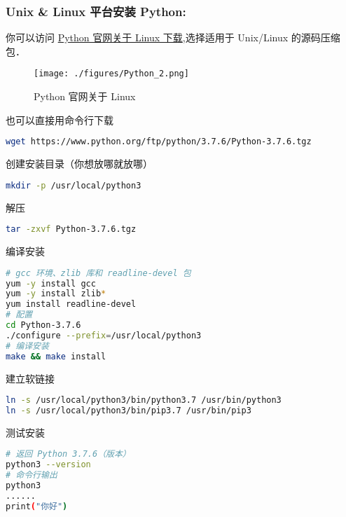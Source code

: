 \subsubsection{Unix & Linux 平台安装 Python:}
你可以访问 \href{https://www.python.org/downloads/source/}{Python 官网关于 Linux 下载},选择适用于 Unix/Linux 的源码压缩包．
\begin{figure}[ht]
\centering
\texttt{[image: ./figures/Python\_2.png]}
\caption{Python 官网关于 Linux} \label{Python_fig2}
\end{figure}

也可以直接用命令行下载
\begin{lstlisting}[language=bash]
wget https://www.python.org/ftp/python/3.7.6/Python-3.7.6.tgz
\end{lstlisting}

创建安装目录（你想放哪就放哪）
\begin{lstlisting}[language=bash]
mkdir -p /usr/local/python3
\end{lstlisting}

解压
\begin{lstlisting}[language=bash]
tar -zxvf Python-3.7.6.tgz
\end{lstlisting}

编译安装
\begin{lstlisting}[language=bash]
# gcc 环境、zlib 库和 readline-devel 包
yum -y install gcc
yum -y install zlib*
yum install readline-devel
# 配置
cd Python-3.7.6
./configure --prefix=/usr/local/python3
# 编译安装
make && make install
\end{lstlisting}

建立软链接
\begin{lstlisting}[language=bash]
ln -s /usr/local/python3/bin/python3.7 /usr/bin/python3
ln -s /usr/local/python3/bin/pip3.7 /usr/bin/pip3
\end{lstlisting}

测试安装
\begin{lstlisting}[language=bash]
# 返回 Python 3.7.6（版本）
python3 --version
# 命令行输出
python3
......
print("你好")
\end{lstlisting}
